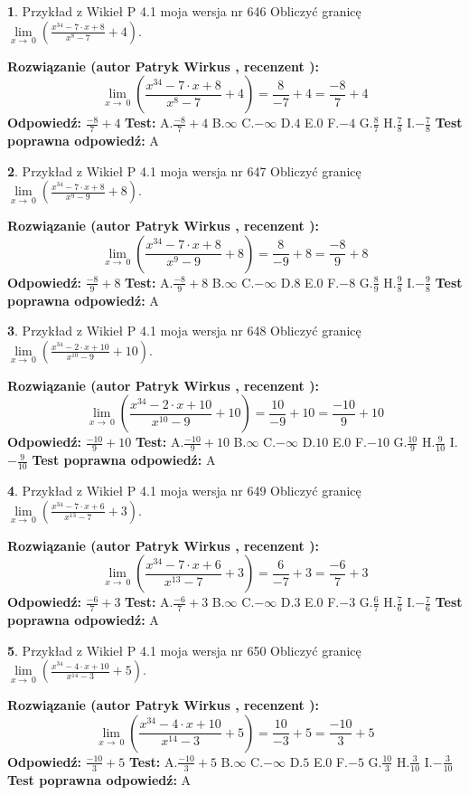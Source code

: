 \documentclass[12pt, a4paper]{article}
\theoremstyle{definition} %
\newtheorem{zad}{}
\newcommand{\zadStart}[1]{\begin{zad}#1\newline}
\newcommand{\zadStop}{\end{zad}}
\newcommand{\rozwStart}[2]{\noindent \textbf{Rozwiązanie (autor #1 , recenzent #2): }\newline}
\newcommand{\rozwStop}{\newline}
\newcommand{\odpStart}{\noindent \textbf{Odpowiedź:}\newline}
\newcommand{\odpStop}{\newline}
\newcommand{\testStart}{\noindent \textbf{Test:}\newline}
\newcommand{\testStop}{\newline}
\newcommand{\kluczStart}{\noindent \textbf{Test poprawna odpowiedź:}\newline}
\newcommand{\kluczStop}{\newline}
\begin{document}
\zadStart{Przykład z Wikieł P 4.1 moja wersja nr 646}
Obliczyć granicę $\lim\limits_{x\to\ 0}(\frac{x^{34}-7 \cdot x +8}{x^{8}-7}+4)$.
\zadStop
\rozwStart{Patryk Wirkus}{}
$$\lim\limits_{x\to\ 0}(\frac{x^{34}-7 \cdot x +8}{x^{8}-7}+4)=\frac{8}{-7}+4=\frac{-8}{7}+4$$
\rozwStop
\odpStart
$\frac{-8}{7}+4$
\odpStop
\testStart
A.$\frac{-8}{7}+4$
B.$\infty$
C.$-\infty$
D.$4$
E.$0$
F.$-4$
G.$\frac{8}{7}$
H.$\frac{7}{8}$
I.$-\frac{7}{8}$
\testStop
\kluczStart
A
\kluczStop



\zadStart{Przykład z Wikieł P 4.1 moja wersja nr 647}
Obliczyć granicę $\lim\limits_{x\to\ 0}(\frac{x^{34}-7 \cdot x +8}{x^{9}-9}+8)$.
\zadStop
\rozwStart{Patryk Wirkus}{}
$$\lim\limits_{x\to\ 0}(\frac{x^{34}-7 \cdot x +8}{x^{9}-9}+8)=\frac{8}{-9}+8=\frac{-8}{9}+8$$
\rozwStop
\odpStart
$\frac{-8}{9}+8$
\odpStop
\testStart
A.$\frac{-8}{9}+8$
B.$\infty$
C.$-\infty$
D.$8$
E.$0$
F.$-8$
G.$\frac{8}{9}$
H.$\frac{9}{8}$
I.$-\frac{9}{8}$
\testStop
\kluczStart
A
\kluczStop



\zadStart{Przykład z Wikieł P 4.1 moja wersja nr 648}
Obliczyć granicę $\lim\limits_{x\to\ 0}(\frac{x^{34}-2 \cdot x +10}{x^{10}-9}+10)$.
\zadStop
\rozwStart{Patryk Wirkus}{}
$$\lim\limits_{x\to\ 0}(\frac{x^{34}-2 \cdot x +10}{x^{10}-9}+10)=\frac{10}{-9}+10=\frac{-10}{9}+10$$
\rozwStop
\odpStart
$\frac{-10}{9}+10$
\odpStop
\testStart
A.$\frac{-10}{9}+10$
B.$\infty$
C.$-\infty$
D.$10$
E.$0$
F.$-10$
G.$\frac{10}{9}$
H.$\frac{9}{10}$
I.$-\frac{9}{10}$
\testStop
\kluczStart
A
\kluczStop



\zadStart{Przykład z Wikieł P 4.1 moja wersja nr 649}
Obliczyć granicę $\lim\limits_{x\to\ 0}(\frac{x^{34}-7 \cdot x +6}{x^{13}-7}+3)$.
\zadStop
\rozwStart{Patryk Wirkus}{}
$$\lim\limits_{x\to\ 0}(\frac{x^{34}-7 \cdot x +6}{x^{13}-7}+3)=\frac{6}{-7}+3=\frac{-6}{7}+3$$
\rozwStop
\odpStart
$\frac{-6}{7}+3$
\odpStop
\testStart
A.$\frac{-6}{7}+3$
B.$\infty$
C.$-\infty$
D.$3$
E.$0$
F.$-3$
G.$\frac{6}{7}$
H.$\frac{7}{6}$
I.$-\frac{7}{6}$
\testStop
\kluczStart
A
\kluczStop



\zadStart{Przykład z Wikieł P 4.1 moja wersja nr 650}
Obliczyć granicę $\lim\limits_{x\to\ 0}(\frac{x^{34}-4 \cdot x +10}{x^{14}-3}+5)$.
\zadStop
\rozwStart{Patryk Wirkus}{}
$$\lim\limits_{x\to\ 0}(\frac{x^{34}-4 \cdot x +10}{x^{14}-3}+5)=\frac{10}{-3}+5=\frac{-10}{3}+5$$
\rozwStop
\odpStart
$\frac{-10}{3}+5$
\odpStop
\testStart
A.$\frac{-10}{3}+5$
B.$\infty$
C.$-\infty$
D.$5$
E.$0$
F.$-5$
G.$\frac{10}{3}$
H.$\frac{3}{10}$
I.$-\frac{3}{10}$
\testStop
\kluczStart
A
\kluczStop
\end{document}

